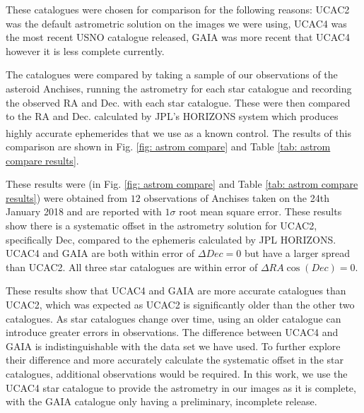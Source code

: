 \documentclass[10pt, twocolumn]{revtex4}    %
\newcommand{\scite}[1]{\textsuperscript{\cite{#1}}}
\begin{document}
These catalogues were chosen for comparison for the following reasons: UCAC2 was the default astrometric solution on the images we were using, UCAC4 was the most recent USNO catalogue released, GAIA was more recent that UCAC4 however it is less complete currently.

The catalogues were compared by taking a sample of our observations of the asteroid Anchises, running the astrometry for each star catalogue and recording the observed RA and Dec. with each star catalogue. These were then compared to the RA and Dec. calculated by JPL's HORIZONS system which produces highly accurate ephemerides that we use as a known control.\scite{HORIZONSSystem} The results of this comparison are shown in Fig. \ref{fig: astrom compare} and Table \ref{tab: astrom compare results}.

These results were (in Fig. \ref{fig: astrom compare} and Table \ref{tab: astrom compare results}) were obtained from  $12$ observations of Anchises taken on the 24th January 2018 and are reported with $1\sigma$ root mean square error. These results show there is a systematic offset in the astrometry solution for UCAC2, specifically Dec, compared to the ephemeris calculated by JPL HORIZONS. UCAC4 and GAIA are both within error of $\Delta Dec = 0$ but have a larger spread than UCAC2. All three star catalogues are within error of $\Delta RA \cos (Dec)=0$.

These results show that UCAC4 and GAIA are more accurate catalogues than UCAC2, which was expected as UCAC2 is significantly older than the other two catalogues. As star catalogues change over time, using an older catalogue can introduce greater errors in observations. The difference between UCAC4 and GAIA is indistinguishable with the data set we have used. To further explore their difference and more accurately calculate the systematic offset in the star catalogues, additional observations would be required. In this work, we use the UCAC4 star catalogue to provide the astrometry in our images as it is complete, with the GAIA catalogue only having a preliminary, incomplete release. 
\end{document}
